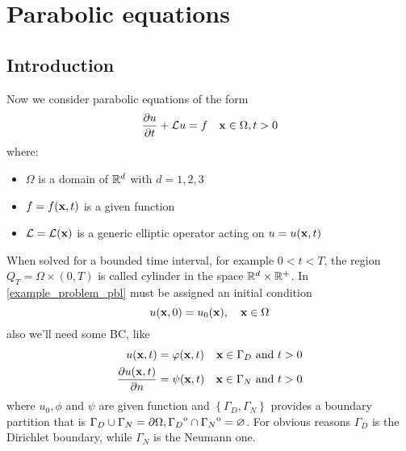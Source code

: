 \newpage
\section{Parabolic equations}
\subsection{Introduction}
Now we consider parabolic equations of the form
\begin{equation}
    \partialderivative{u}{t} + \loperator u = f \quad \vect{x} \in \Omega, t>0
    \label{example_problem_pbl}
\end{equation}
where: 
\begin{itemize}
    \item \(\Omega\) is a domain of \(\mathbb{R}^d\) with \(d = 1,2,3\)
    \item \(f = f(\textbf{x}, t)\) is a given function 
    \item \(\mathcal{L} = \mathcal{L} (\textbf{x})\) is a generic elliptic operator acting on \(u = u(\textbf{x}, t)\)
\end{itemize}
When solved for a bounded time interval, for example \(0 < t < T\), the region \(Q_T = \Omega \times (0,T)\) is called cylinder in the space \(\mathbb{R}^d \times \mathbb{R}^+\). 
In \eqref{example_problem_pbl} must be assigned an initial condition 
\begin{equation}
    u(\textbf{x}, 0) = u_0(\textbf{x}),\quad \textbf{x} \in \Omega
    \label{initial_cond_pbl}
\end{equation}
also we'll need some BC, like 
\begin{equation}
    \begin{aligned}
        u(\xvec, t) &= \phi(\xvec, t) & \xvec \in \Gamma_D \txt{ and } t > 0 \\
        \partialderivative{u(\xvec, t)}{n} &=\psi(\xvec, t) & \xvec \in \Gamma_N \txt{ and } t > 0 
    \end{aligned}
    \label{BC_example_pbl}
\end{equation}
where \(u_0, \phi\) and \(\psi\) are given function and \(\left\{ \Gamma_D, \Gamma_N \right\}\) provides a boundary partition that is \(\Gamma_D \cup \Gamma_N = {\partial\Omega}, {\kern0pt\Gamma_D}^{\mathrm{o}} \cap {\kern0pt\Gamma_N}^{\mathrm{o}} = \varnothing\). For obvious reasons \(\Gamma_D\) is the Dirichlet boundary, while \(\Gamma_N\) is the Neumann one.

